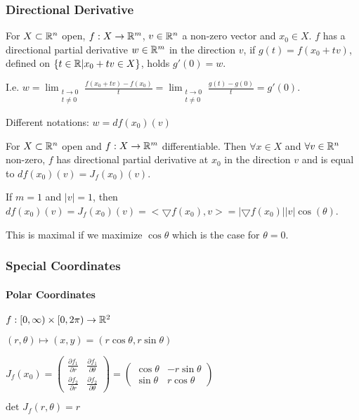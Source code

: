 \subsubsection{Directional Derivative}
For $X \subset \mathbb{R}^n$ open, $f: X \to \mathbb{R}^m$, $v \in \mathbb{R}^n$ a non-zero vector and $x_0 \in X$. $f$ has a directional partial derivative $w \in \mathbb{R}^m$ in the direction $v$, if $g(t) = f(x_0 + tv)$, defined on $\{t \in \mathbb{R} | x_0 + tv \in X\}$, holds $g'(0) = w$.

\begin{compactitem}
    \item I.e. $w = \lim_{\substack{t \to 0\\ t \neq 0}} \frac{f(x_0 + tv) - f(x_0)}{t} = \lim_{\substack{t \to 0\\ t \neq 0}} \frac{g(t) - g(0)}{t} = g'(0)$.
    \item Different notations: $w = df(x_0)(v)$
\end{compactitem}

For $X \subset \mathbb{R}^n$ open and $f: X \to \mathbb{R}^m$ differentiable. Then $\forall x \in X$ and $\forall v \in \mathbb{R}^n$ non-zero, $f$ has directional partial derivative at $x_0$ in the direction $v$ and is equal to $df(x_0) (v) = J_f(x_0)(v)$.

\begin{compactitem}
\item If $m = 1$ and $|v| = 1$, then $df(x_0) (v) = J_f(x_0)(v) = <\bigtriangledown f(x_0), v> = |\bigtriangledown f(x_0)||v|\cos(\theta)$.
    \begin{compactitem}
        \item This is maximal if we maximize $\cos \theta$ which is the case for $\theta = 0$.
    \end{compactitem}
\end{compactitem}

\subsubsection{Special Coordinates}
\paragraph{Polar Coordinates}
\begin{inparaitem}
    \item $f: [0, \infty) \times [0, 2\pi) \to \mathbb{R}^2$
    \item $(r, \theta) \mapsto (x, y) = (r \cos \theta, r \sin \theta)$
    \item $J_f(x_0) =
        \begin{pmatrix}
            \frac{\partial f_1}{\partial r} & \frac{\partial f_1}{\partial \theta}\\
            \frac{\partial f_2}{\partial r} & \frac{\partial f_2}{\partial \theta}
        \end{pmatrix} =
        \begin{pmatrix}
            \cos \theta & -r \sin \theta\\
            \sin \theta & r \cos \theta
        \end{pmatrix}$
    \item $\text{det }J_f(r, \theta) = r$
\end{inparaitem}

